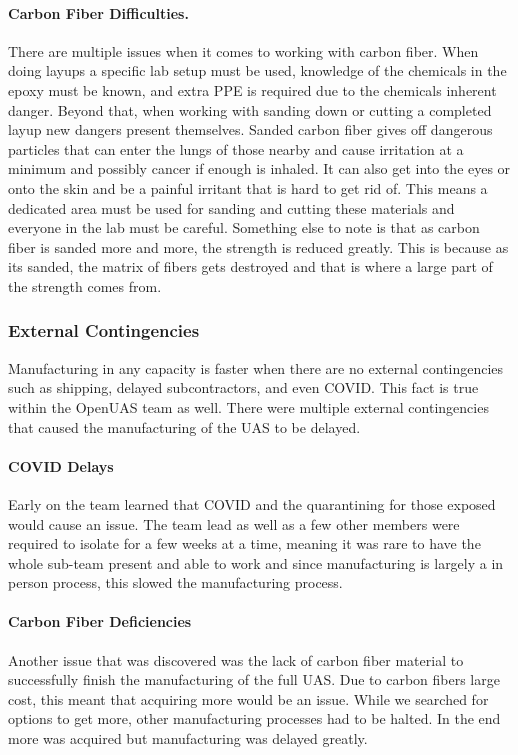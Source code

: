 \documentclass{article}
\begin{document}
\paragraph{Carbon Fiber Difficulties.}
There are multiple issues when it comes to working with carbon fiber. When doing layups a specific lab setup must be used, knowledge of the chemicals in the epoxy must be known, and extra PPE is required due to the chemicals inherent danger. Beyond that, when working with sanding down or cutting a completed layup new dangers present themselves. Sanded carbon fiber gives off dangerous particles that can enter the lungs of those nearby and cause irritation at a minimum and possibly cancer if enough is inhaled. It can also get into the eyes or onto the skin and be a painful irritant that is hard to get rid of. This means a dedicated area must be used for sanding and cutting these materials and everyone in the lab must be careful. Something else to note is that as carbon fiber is sanded more and more, the strength is reduced greatly. This is because as its sanded, the matrix of fibers gets destroyed and that is where a large part of the strength comes from.

\subsubsection{External Contingencies}
Manufacturing in any capacity is faster when there are no external contingencies such as shipping, delayed subcontractors, and even COVID. This fact is true within the OpenUAS team as well. There were multiple external contingencies that caused the manufacturing of the UAS to be delayed.
\paragraph{COVID Delays}
Early on the team learned that COVID and the quarantining for those exposed would cause an issue. The team lead as well as a few other members were required to isolate for a few weeks at a time, meaning it was rare to have the whole sub-team present and able to work and since manufacturing is largely a in person process, this slowed the manufacturing process.

\paragraph{Carbon Fiber Deficiencies}
Another issue that was discovered was the lack of carbon fiber material to successfully finish the manufacturing of the full UAS. Due to carbon fibers large cost, this meant that acquiring more would be an issue. While we searched for options to get more, other manufacturing processes had to be halted. In the end more was acquired but manufacturing was delayed greatly.
\end{document}
